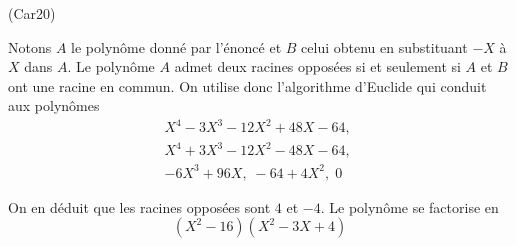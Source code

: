 \begin{tiny}(Car20)\end{tiny} Notons $A$ le polynôme donné par l'énoncé et $B$ celui obtenu en substituant $-X$ à $X$ dans $A$.\newline
Le polynôme $A$ admet deux racines opposées si et seulement si $A$ et $B$ ont une racine en commun. On utilise donc l'algorithme d'Euclide qui conduit aux polynômes
\begin{multline*}
 X^4-3X^3-12X^2+48X-64,\\
X^4+3X^3-12X^2-48X-64,\;\\
-6X^3+96X,\; -64+4X^2,\;0
\end{multline*}

On en déduit que les racines opposées sont $4$ et $-4$. Le polynôme se factorise en
\begin{displaymath}
 (X^2-16)(X^2-3X+4)
\end{displaymath}
